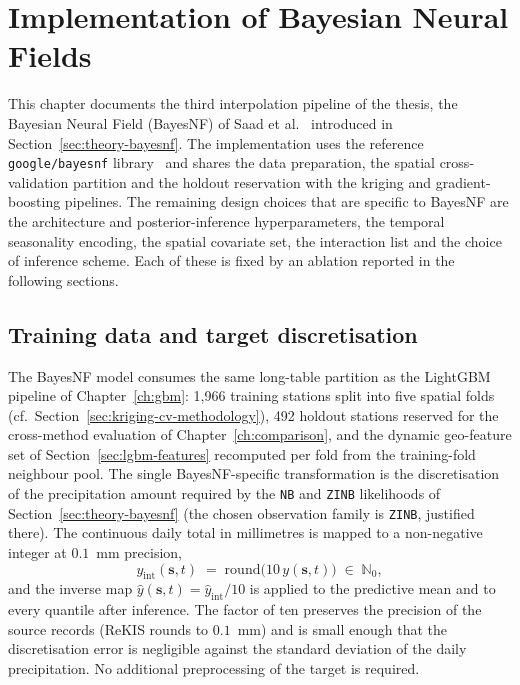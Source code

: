 \chapter{Implementation of Bayesian Neural Fields}
\label{ch:bayesnf}

This chapter documents the third interpolation pipeline of the thesis,
the Bayesian Neural Field (BayesNF) of Saad et al.~\cite{saad2024bnf}
introduced in Section~\ref{sec:theory-bayesnf}. The implementation uses
the reference \texttt{google/bayesnf} library~\cite{bayesnfRepo} and
shares the data preparation, the spatial cross-validation partition and
the holdout reservation with the kriging and gradient-boosting
pipelines. The remaining design choices that are specific to BayesNF are
the architecture and posterior-inference hyperparameters, the temporal
seasonality encoding, the spatial covariate set, the interaction list
and the choice of inference scheme. Each of these is fixed by an
ablation reported in the following sections.

\section{Training data and target discretisation}
\label{sec:bayesnf-data}

The BayesNF model consumes the same long-table partition as the
LightGBM pipeline of Chapter~\ref{ch:gbm}: 1{,}966 training stations
split into five spatial folds (cf.\
Section~\ref{sec:kriging-cv-methodology}), 492 holdout stations
reserved for the cross-method evaluation of
Chapter~\ref{ch:comparison}, and the dynamic geo-feature set of
Section~\ref{sec:lgbm-features} recomputed per fold from the
training-fold neighbour pool. The single BayesNF-specific transformation
is the discretisation of the precipitation amount required by the
\texttt{NB} and \texttt{ZINB} likelihoods of
Section~\ref{sec:theory-bayesnf} (the chosen observation family is
\texttt{ZINB}, justified there). The continuous daily total in
millimetres is mapped to a non-negative integer at $0{.}1$~mm precision,
\begin{equation}
  y_{\mathrm{int}}(\mathbf{s},t) \;=\;
  \mathrm{round}\!\bigl(10\, y(\mathbf{s},t)\bigr)
    \;\in\; \mathbb{N}_{0},
  \label{eq:bnf-discretisation}
\end{equation}
and the inverse map $\hat{y}(\mathbf{s},t) = \hat{y}_{\mathrm{int}}/10$
is applied to the predictive mean and to every quantile after inference.
The factor of ten preserves the precision of the source records
(ReKIS rounds to $0{.}1$~mm) and is small enough that the
discretisation error is negligible against the standard deviation of
the daily precipitation. No additional preprocessing of the target is
required.

